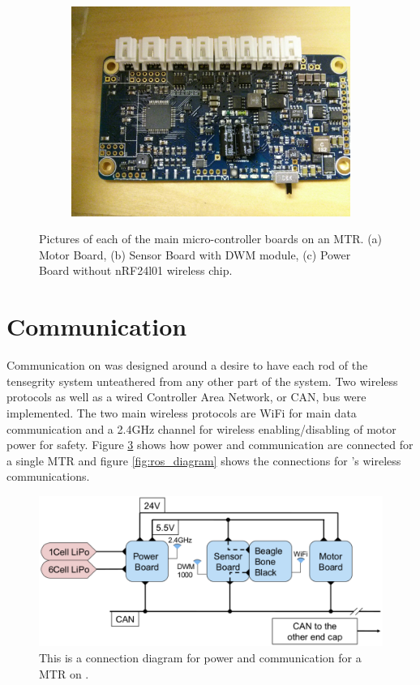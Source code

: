 \begin{figure}[thpb]
\begin{subfigure}{.3\textwidth}
      \includegraphics[width=\columnwidth]{tex/img/power_board}
      \caption{}
      \label{fig:power_board}
\end{subfigure}
\caption{Pictures of each of the main micro-controller boards on an MTR. (a) Motor Board, (b) Sensor Board with DWM module, (c) Power Board without nRF24l01 wireless chip.}
\label{fig:MTR_uC_boards}
\end{figure}

\section{Communication}
\label{communication}

Communication on \SB{} was designed around a desire to have each rod of the tensegrity system unteathered from any other part of the system.
Two wireless protocols as well as a wired Controller Area Network, or CAN, bus were implemented.
The two main wireless protocols are WiFi for main data communication and a 2.4GHz channel for wireless enabling/disabling of motor power for safety.
Figure \ref{fig:connection_diagram} shows how power and communication are connected for a single MTR and figure \ref{fig:ros_diagram} shows the connections for \SB{}'s wireless communications.

\begin{figure}[thpb]%
      \centering
      \includegraphics[width=0.8\columnwidth]{tex/img/hard_wire_connection}
      \caption{This is a connection diagram for power and communication for a MTR on \SB{}.}
      \label{fig:connection_diagram}
\end{figure}

